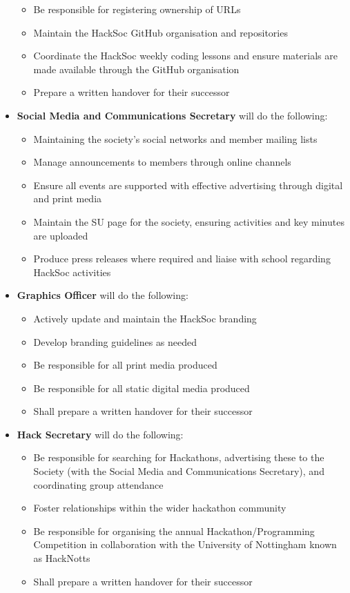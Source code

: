 \documentclass[a4paper,twoside,notitlepage,11pt]{article}
\begin{document}
\begin{itemize}
\begin{itemize}
	  \item Be responsible for registering ownership of URLs
	  \item Maintain the HackSoc GitHub organisation and repositories
	  \item Coordinate the HackSoc weekly coding lessons and ensure materials are made available through the GitHub organisation
	  \item Prepare a written handover for their successor
	\end{itemize}
	\item \textbf{Social Media and Communications Secretary} will do the following:
	\begin{itemize}
	  \item Maintaining the society's social networks and member mailing lists
	  \item Manage announcements to members through online channels
	  \item Ensure all events are supported with effective advertising through digital and print media
	  \item Maintain the SU page for the society, ensuring activities and key minutes are uploaded
	  \item Produce press releases where required and liaise with school regarding HackSoc activities
	\end{itemize}
	\item \textbf{Graphics Officer} will do the following:
	\begin{itemize}
	  \item Actively update and maintain the HackSoc branding
	  \item Develop branding guidelines as needed
	  \item Be responsible for all print media produced
	  \item Be responsible for all static digital media produced
	  \item Shall prepare a written handover for their successor
	\end{itemize}
	\item \textbf{Hack Secretary} will do the following:
	\begin{itemize}
	  \item Be responsible for searching for Hackathons, advertising these to the Society (with the Social Media and Communications Secretary), and coordinating group attendance
	  \item Foster relationships within the wider hackathon community
	  \item Be responsible for organising the annual Hackathon/Programming Competition in collaboration with the University of Nottingham known as HackNotts
	  \item Shall prepare a written handover for their successor
	\end{itemize}

\end{itemize}
\end{document}
